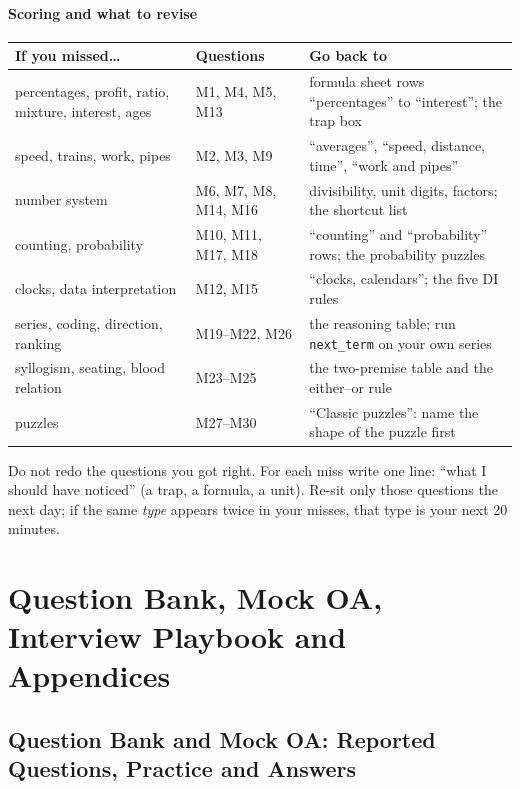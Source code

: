 \documentclass[10pt,a4paper,openany,oneside]{report}
\begin{document}
\subsection*{Scoring and what to revise}
\begin{center}\small
\begin{xltabular}{\textwidth}{@{}L{4.5cm}L{3.3cm}Y@{}}
\toprule
\textbf{If you missed\ldots} & \textbf{Questions} & \textbf{Go back to}\\
\midrule\endhead
percentages, profit, ratio, mixture, interest, ages & M1, M4, M5, M13 & formula sheet rows ``percentages'' to ``interest''; the trap box\\
speed, trains, work, pipes & M2, M3, M9 & ``averages'', ``speed, distance, time'', ``work and pipes''\\
number system & M6, M7, M8, M14, M16 & divisibility, unit digits, factors; the shortcut list\\
counting, probability & M10, M11, M17, M18 & ``counting'' and ``probability'' rows; the probability puzzles\\
clocks, data interpretation & M12, M15 & ``clocks, calendars''; the five DI rules\\
series, coding, direction, ranking & M19--M22, M26 & the reasoning table; run \texttt{next\_term} on your own series\\
syllogism, seating, blood relation & M23--M25 & the two-premise table and the either--or rule\\
puzzles & M27--M30 & ``Classic puzzles'': name the shape of the puzzle first\\
\bottomrule
\end{xltabular}
\end{center}
\begin{tipbox}
Do not redo the questions you got right. For each miss write one line: ``what I should have noticed'' (a trap, a formula, a unit). Re-sit only those questions the next day; if the same \emph{type} appears twice in your misses, that type is your next 20 minutes.
\end{tipbox}


\part{Question Bank, Mock OA, Interview Playbook and Appendices}
\chapter{Question Bank and Mock OA: Reported Questions, Practice and Answers}
\label{ch:qbank}
\end{document}
